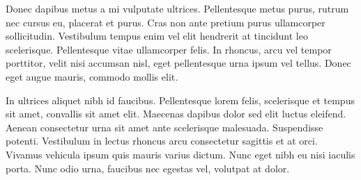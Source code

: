 \documentclass[12pt,lot,lof]{quthesis}
\begin{document}
Donec dapibus metus a mi vulputate ultrices. Pellentesque metus purus, rutrum nec cursus eu, placerat et purus. Cras non ante pretium purus ullamcorper sollicitudin. Vestibulum tempus enim vel elit hendrerit at tincidunt leo scelerisque. Pellentesque vitae ullamcorper felis. In rhoncus, arcu vel tempor porttitor, velit nisi accumsan nisl, eget pellentesque urna ipsum vel tellus. Donec eget augue mauris, commodo mollis elit.

In ultrices aliquet nibh id faucibus. Pellentesque lorem felis, scelerisque et tempus sit amet, convallis sit amet elit. Maecenas dapibus dolor sed elit luctus eleifend. Aenean consectetur urna sit amet ante scelerisque malesuada. Suspendisse potenti. Vestibulum in lectus rhoncus arcu consectetur sagittis et at orci. Vivamus vehicula ipsum quis mauris varius dictum. Nunc eget nibh eu nisi iaculis porta. Nunc odio urna, faucibus nec egestas vel, volutpat at dolor.

\singlespacing


\cleardoublepage
\ifdefined{}
\else
\fi
{}




\end{document}
